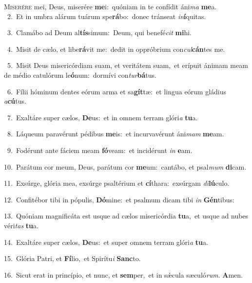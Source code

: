 \lettrine{\initial\textcolor{\initialcolor}{M}}{iserére} mei, Deus, miserére \textbf{me}\-i:~\star quóniam in te confídit áni\textit{ma} \textbf{me}\-a.\\
{\numbfont\textcolor{\numbcolor}{~2.}}~Et in umbra alárum tuárum spe\-\textbf{rá}\-bo:~\star donec tránseat \textit{in}\-\textbf{í}quitas.\par
{\numbfont\textcolor{\numbcolor}{~3.}}~Clamábo ad Deum al\-\textbf{tís}\-simum:~\star Deum, qui benefé\textit{cit} \textbf{mi}\-hi.\par
{\numbfont\textcolor{\numbcolor}{~4.}}~Misit de cælo, et libe\-\textbf{rá}\-vit me:~\star dedit in oppróbrium con\-\textit{cul}\-\textbf{cán}tes me.\par
{\numbfont\textcolor{\numbcolor}{~5.}}~Misit Deus misericórdiam suam, et veritátem suam,~\dagger et erípuit ánimam meam de médio catulórum le\-\textbf{ó}\-num:~\star dormívi con\-\textit{tur}\-\textbf{bá}tus.\par
{\numbfont\textcolor{\numbcolor}{~6.}}~Fílii hóminum dentes eórum arma et sa\-\textbf{gít}\-tæ:~\star et lingua eórum gládius \textit{a}\-\textbf{cú}tus.\par
{\numbfont\textcolor{\numbcolor}{~7.}}~Exaltáre super cælos, \textbf{De}\-us:~\star et in omnem terram glóri\textit{a} \textbf{tu}\-a.\par
{\numbfont\textcolor{\numbcolor}{~8.}}~Láqueum paravérunt pédibus \textbf{me}\-is:~\star et incurvavérunt áni\textit{mam} \textbf{me}\-am.\par
{\numbfont\textcolor{\numbcolor}{~9.}}~Fodérunt ante fáciem meam \textbf{fó}\-veam:~\star et incidérunt \textit{in} \textbf{e}\-am.\par
{\numbfont\textcolor{\numbcolor}{10.}}~Parátum cor meum, Deus, parátum cor \textbf{me}\-um:~\star cantábo, et psal\textit{mum} \textbf{di}\-cam.\par
{\numbfont\textcolor{\numbcolor}{11.}}~Exsúrge, glória mea, exsúrge psaltérium et \textbf{cí}\-thara:~\star exsúrgam \textit{di}\-\textbf{lú}culo.\par
{\numbfont\textcolor{\numbcolor}{12.}}~Confitébor tibi in pópulis, \textbf{Dó}\-mine:~\star et psalmum dicam tibi \textit{in} \textbf{Gén}\-tibus:\par
{\numbfont\textcolor{\numbcolor}{13.}}~Quóniam magnificáta est usque ad cælos misericórdia \textbf{tu}\-a,~\star et usque ad nubes véri\textit{tas} \textbf{tu}\-a.\par
{\numbfont\textcolor{\numbcolor}{14.}}~Exaltáre super cælos, \textbf{De}\-us:~\star et super omnem terram glóri\textit{a} \textbf{tu}\-a.\par
{\numbfont\textcolor{\numbcolor}{15.}}~Glória Patri, et \textbf{Fí}\-lio,~\star et Spirítu\textit{i} \textbf{Sanc}\-to.\par
{\numbfont\textcolor{\numbcolor}{16.}}~Sicut erat in princípio, et nunc, et \textbf{sem}\-per,~\star et in sǽcula sæculó\-\textit{rum}\-. \textbf{A}\-men.\par
